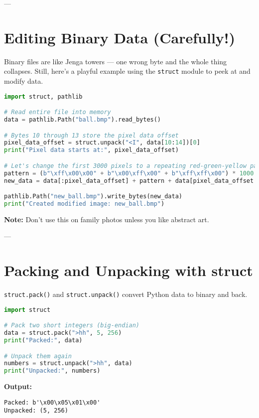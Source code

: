 ---

\section{Editing Binary Data (Carefully!)}

Binary files are like Jenga towers — one wrong byte and the whole thing collapses.  
Still, here’s a playful example using the \texttt{struct} module to peek at and modify data.

\begin{lstlisting}[language=Python, caption={Altering part of a BMP image.}]
import struct, pathlib

# Read entire file into memory
data = pathlib.Path("ball.bmp").read_bytes()

# Bytes 10 through 13 store the pixel data offset
pixel_data_offset = struct.unpack("<I", data[10:14])[0]
print("Pixel data starts at:", pixel_data_offset)

# Let's change the first 3000 pixels to a repeating red-green-yellow pattern
pattern = (b"\xff\x00\x00" + b"\x00\xff\x00" + b"\xff\xff\x00") * 1000
new_data = data[:pixel_data_offset] + pattern + data[pixel_data_offset + len(pattern):]

pathlib.Path("new_ball.bmp").write_bytes(new_data)
print("Created modified image: new_ball.bmp")
\end{lstlisting}

\textbf{Note:} Don’t use this on family photos unless you like abstract art.

---

\section{Packing and Unpacking with struct}

\texttt{struct.pack()} and \texttt{struct.unpack()} convert Python data to binary and back.

\begin{lstlisting}[language=Python, caption={Packing and unpacking values.}]
import struct

# Pack two short integers (big-endian)
data = struct.pack(">hh", 5, 256)
print("Packed:", data)

# Unpack them again
numbers = struct.unpack(">hh", data)
print("Unpacked:", numbers)
\end{lstlisting}

\textbf{Output:}
\begin{verbatim}
Packed: b'\x00\x05\x01\x00'
Unpacked: (5, 256)
\end{verbatim}

